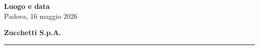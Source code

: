 \documentclass[a4paper, 10pt, colorlinks=true, linkcolor=black, urlcolor=blue, citecolor=blue, hidelinks]{article}
\begin{document}
\vfill

\noindent
\begin{minipage}[t]{0.45\textwidth}
  \textbf{Luogo e data} \\
  \vspace{0.5cm}
  Padova, 16 maggio 2026
\end{minipage}
\hfill
\begin{minipage}[t]{0.45\textwidth}
  \raggedleft
  \textbf{Zucchetti S.p.A.} \\
  \vspace{1.8cm} 
  \rule{6cm}{0.4pt}
\end{minipage}
\end{document}
